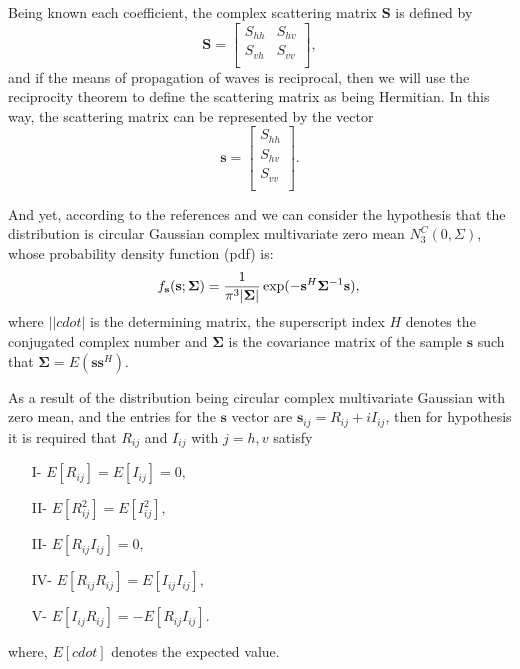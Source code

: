 \documentclass[conference]{IEEEtran}
\begin{document}
{{{{Being known each coefficient, the complex scattering matrix $\mathbf{S}$ is defined by
\begin{equation}\label{eq_01}
\mathbf{S} = \left[
\begin{array}{cc}
	S_{hh}   & S_{hv}   \\
	S_{vh}   & S_{vv}   \\
\end{array}
\right],
\end{equation}
and if the means of propagation of waves is reciprocal, then we will use the reciprocity theorem \cite{lp} to define the scattering matrix as being Hermitian. In this way, the scattering matrix can be represented by the vector
\begin{equation}\label{eq_02}
\mathbf{s} = \left[
\begin{array}{c}
	S_{hh}     \\
    S_{hv}     \\
	S_{vv}     \\
\end{array}
\right].
\end{equation}


And yet, according to the references \cite{good} and \cite{lee} we can consider the hypothesis that the distribution is circular Gaussian complex multivariate zero mean $N^C_3(0,\Sigma)$, whose probability density function (pdf) is:
\begin{equation}\label{eq_03}
    f_{\mathbf{s}}(\mathbf{s};\mathbf{\Sigma})=\frac{1}{\pi^3|\mathbf{\Sigma}|} \exp(-\mathbf{s}^H\mathbf{\Sigma}^{-1}\mathbf{s}), \\
\end{equation}
where $||cdot|$ is the determining matrix, the superscript index $H$ denotes the conjugated complex number and $\mathbf{\Sigma}$ is the covariance matrix of the sample $\mathbf{s}$ such that $\mathbf{\Sigma}=E(\mathbf{ss}^H)$. 

As a result of the distribution being circular complex multivariate Gaussian with zero mean, and the entries for the $\mathbf{s}$ vector are $\mathbf{s}_{ij}= R_{ij}+ i I_{ij}$, then for hypothesis it is required that $R_{ij}$ and $I_{ij}$ with $j=h,v$ satisfy 
\begin{itemize}
	\item[I-] $E[R_{ij}]=E[I_{ij}]=0,$
	\item[II-] $E[R_{ij}^2]=E[I_{ij}^2],$ 
	\item[II-] $E[R_{ij}I_{ij}]=0,$  
	\item[IV-] $E[R_{ij}R_{ij}]=E[I_{ij}I_{ij}],$ 
	\item[V-] $E[I_{ij}R_{ij}]=-E[R_{ij}I_{ij}].$
\end{itemize}
where, $E[cdot]$ denotes the expected value. 

}}}}
\end{document}
